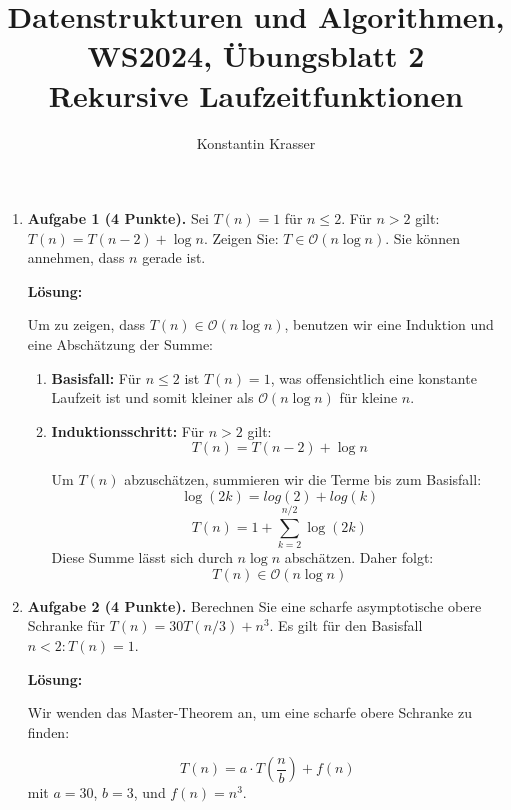 \documentclass[11pt]{article}
\begin{document}
\author{Konstantin Krasser}
\title{Datenstrukturen und Algorithmen, WS2024, Übungsblatt 2\\Rekursive Laufzeitfunktionen}
\maketitle

\medskip

\begin{enumerate}

	\item
	      \textbf{Aufgabe 1 (4 Punkte).} Sei \(T(n)=1\) für \(n \leq 2\). Für \(n>2\) gilt: \(T(n)=T(n-2)+\log n\). Zeigen Sie: \(T \in \mathcal{O}(n \log n)\). Sie können annehmen, dass \(n\) gerade ist.

	      \textbf{Lösung:}

	      Um zu zeigen, dass \(T(n) \in \mathcal{O}(n \log n)\), benutzen wir eine Induktion und eine Abschätzung der Summe:

	      \begin{enumerate}
		      \item \textbf{Basisfall:} Für \(n \leq 2\) ist \(T(n) = 1\), was offensichtlich eine konstante Laufzeit ist und somit kleiner als \(\mathcal{O}(n \log n)\) für kleine \(n\).
		      \item \textbf{Induktionsschritt:} Für \(n > 2\) gilt:
		            \[
			            T(n) = T(n-2) + \log n
		            \]

		            Um \(T(n)\) abzuschätzen, summieren wir die Terme bis zum Basisfall:
		            \[
			            \log(2k)=log(2)+log(k)
		            \]
		            \[
			            T(n) = 1 + \sum_{k=2}^{n/2} \log(2k)
		            \]
		            Diese Summe lässt sich durch \(n \log n\) abschätzen. Daher folgt:
		            \[
			            T(n) \in \mathcal{O}(n \log n)
		            \]
	      \end{enumerate}

	\item
	      \textbf{Aufgabe 2 (4 Punkte).} Berechnen Sie eine scharfe asymptotische obere Schranke für \(T(n)=30 T(n / 3)+n^3\). Es gilt für den Basisfall \(n<2: T(n)=1\).

	      \textbf{Lösung:}

	      Wir wenden das Master-Theorem an, um eine scharfe obere Schranke zu finden:

	      \[
		      T(n) = a \cdot T\left(\frac{n}{b}\right) + f(n)
	      \]
	      mit \(a = 30\), \(b = 3\), und \(f(n) = n^3\).


\end{enumerate}
\end{document}
